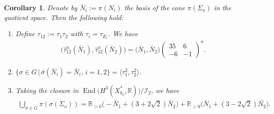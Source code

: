 \documentclass[10pt,a4paper]{amsart}
\numberwithin{equation}{section}
\newtheorem{Corollary}[Theorem]{Corollary}
\begin{document}
\begin{Corollary}\label{cor:Union-cones-P3P3}Denote by $\bar{N}_{i}:=\pi(N_{i})$ the basis of the cone $\pi(\Sigma_{o})$ in the quotient space. Then the following hold:
\begin{enumerate}\itemsep=0pt
\item[{\rm (1)}] Define $\tau_{12}:=\tau_{1}\tau_{2}$ with $\tau_{i}=\tau_{E_{i}}$. We have
\begin{gather*}
\big(\bar{\tau}_{12}^{n}(\bar{N}_{1}),\bar{\tau}_{12}^{n}(\bar{N}_{2})\big)=\big(\bar{N}_{1},\bar{N}_{2}\big)\left(\begin{matrix}35 & 6\\
-6 & -1
\end{matrix}\right)^{n}.
\end{gather*}

\item[{\rm (2)}] $\{ \sigma\in G\,|\,\bar{\sigma}(\bar{N}_{i})=\bar{N}_{i}, \, i=1,2 \} =\langle\tau_{1}^{2},\tau_{2}^{2}\rangle$.

\item[{\rm (3)}] Taking the closure in $\operatorname{End}\big(H^{3}(X_{b_{0}}^{*},\mathbb{R})\big)/\mathcal{I}_{2}$, we have
\begin{gather*}
\bigcup_{\sigma\in G}\overline{\pi(\sigma(\Sigma_{o}))}=\mathbb{R}_{>0}\big({-}\bar{N}_{1}+(3+2\sqrt{2})\bar{N}_{2}\big)+\mathbb{R}_{>0}\big(\bar{N}_{1}+(3-2\sqrt{2})\bar{N_{2}}\big).
\end{gather*}
\end{enumerate}\end{Corollary}
\end{document}

